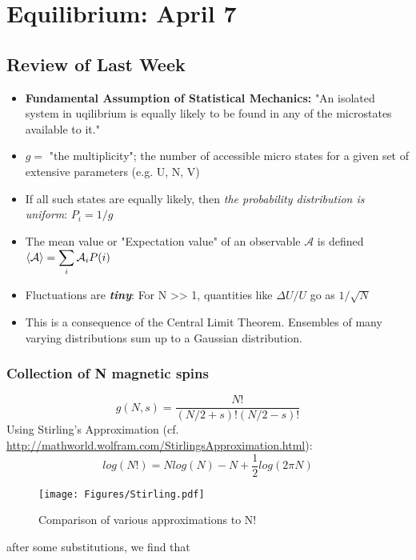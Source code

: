 \section{Equilibrium: April 7}

\subsection{Review of Last Week}
\begin{itemize}
\item \textbf{Fundamental Assumption of Statistical Mechanics:} "An isolated system in uqilibrium is equally likely to be found in any of the microstates available to it."

\item $g =$ "the multiplicity"; the number of accessible micro states for a given set of extensive parameters (e.g. U, N, V)

\item If all such states are equally likely, then \textit{the probability distribution is uniform}: $P_i = 1/g$

\item The mean value or "Expectation value" of an observable $\mathcal{A}$ is defined 
  $\Braket{\mathcal{A}} = \displaystyle \sum_{i} \mathcal{A}_i P(i)$

\item Fluctuations are \textit{\textbf{tiny}}: For N >> 1, quantities like $\Delta U/U$ go as $1/\sqrt{N}$

\item This is a consequence of the Central Limit Theorem. Ensembles of many varying distributions sum up to a Gaussian distribution.

\end{itemize}

\subsubsection{Collection of N magnetic spins}
\begin{equation}
g(N,s) = \frac{N!}{(N/2 + s)! (N/2-s)!}
\end{equation}
Using Stirling's Approximation (cf. \url{http://mathworld.wolfram.com/StirlingsApproximation.html}):
\begin{equation}
log(N!) = N log(N) - N + \frac{1}{2}log(2 \pi N)
\end{equation}
\begin{figure}[h]
\centering
\texttt{[image: Figures/Stirling.pdf]}
\caption{Comparison of various approximations to N!}
\end{figure}
after some substitutions, we find that


